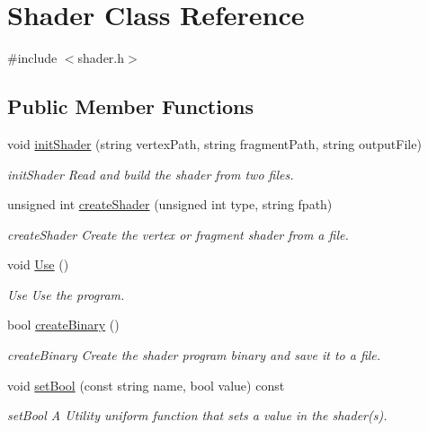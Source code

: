 \hypertarget{classShader}{}\section{Shader Class Reference}
\label{classShader}


{\ttfamily \#include $<$shader.\+h$>$}

\subsection*{Public Member Functions}
\begin{DoxyCompactItemize}
\item 
void \hyperlink{classShader_af73d7e0d84dcdcfe0beb871ac796928c}{init\+Shader} (string vertex\+Path, string fragment\+Path, string output\+File)
\begin{DoxyCompactList}\small\item\em init\+Shader Read and build the shader from two files. \end{DoxyCompactList}\item 
unsigned int \hyperlink{classShader_a5a9535209cf2d04bbeff96f8a945f227}{create\+Shader} (unsigned int type, string fpath)
\begin{DoxyCompactList}\small\item\em create\+Shader Create the vertex or fragment shader from a file. \end{DoxyCompactList}\item 
\mbox{\label{classShader_a6b11327cff651ffdb22988b6917b1650}} 
void \hyperlink{classShader_a6b11327cff651ffdb22988b6917b1650}{Use} ()
\begin{DoxyCompactList}\small\item\em Use Use the program. \end{DoxyCompactList}\item 
bool \hyperlink{classShader_a0793a05d73a73529c963c2d59b166440}{create\+Binary} ()
\begin{DoxyCompactList}\small\item\em create\+Binary Create the shader program binary and save it to a file. \end{DoxyCompactList}\item 
\mbox{\label{classShader_ae60698f3e6542b71436609cf300e2ec3}} 
void \hyperlink{classShader_ae60698f3e6542b71436609cf300e2ec3}{set\+Bool} (const string name, bool value) const
\begin{DoxyCompactList}\small\item\em set\+Bool A Utility uniform function that sets a value in the shader(s). \end{DoxyCompactList}\item 

\end{DoxyCompactItemize}
